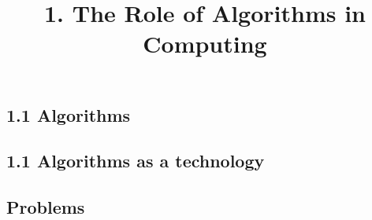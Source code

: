 
\title{\large 1. The Role of Algorithms in Computing}

\subsection*{1.1 Algorithms}


\subsection*{1.1 Algorithms as a technology}


\subsection*{Problems}

